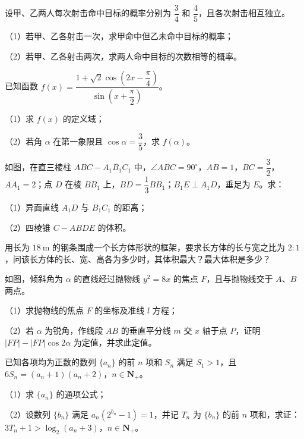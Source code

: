 \begin{question}
设甲、乙两人每次射击命中目标的概率分别为 $\dfrac34$ 和 $\dfrac45$，且各次射击相互独立。

（1）若甲、乙各射击一次，求甲命中但乙未命中目标的概率；

（2）若甲、乙各射击两次，求两人命中目标的次数相等的概率。

\end{question}
\begin{question}
已知函数 $f(x)=\dfrac{1+\sqrt2\cos\left(2x-\dfrac{\pi}{4}\right)}{\sin\left(x+\dfrac{\pi}{2}\right)}$。

（1）求 $f(x)$ 的定义域；

（2）若角 $\alpha$ 在第一象限且 $\cos\alpha=\dfrac35$，求 $f(\alpha)$。

\Needspace{0.4\textheight}
\end{question}
\begin{question}
如图，在直三棱柱 $ABC-A_1B_1C_1$ 中，$\angle ABC=90^\circ$，$AB=1$，$BC=\dfrac32$，$AA_1=2$；点 $D$ 在棱 $BB_1$ 上，$BD=\dfrac13BB_1$；$B_1E\perp A_1D$，垂足为 $E$。求：

（1）异面直线 $A_1D$ 与 $B_1C_1$ 的距离；

（2）四棱锥 $C-ABDE$ 的体积。
\nopagebreak[4]
\begin{center}\end{center}
\nopagebreak[4]
\end{question}
\begin{question}
用长为 $18\ \mathrm m$ 的钢条围成一个长方体形状的框架，要求长方体的长与宽之比为 $2:1$，问该长方体的长、宽、高各为多少时，其体积最大？最大体积是多少？

\Needspace{0.4\textheight}
\end{question}
\begin{question}
如图，倾斜角为 $\alpha$ 的直线经过抛物线 $y^2=8x$ 的焦点 $F$，且与抛物线交于 $A$、$B$ 两点。

（1）求抛物线的焦点 $F$ 的坐标及准线 $l$ 方程；

（2）若 $\alpha$ 为锐角，作线段 $AB$ 的垂直平分线 $m$ 交 $x$ 轴于点 $P$，证明 $|FP|-|FP|\cos2\alpha$ 为定值，并求此定值。
\nopagebreak[4]
\begin{center}\end{center}
\nopagebreak[4]
\end{question}
\begin{question}
已知各项均为正数的数列 $\{a_n\}$ 的前 $n$ 项和 $S_n$ 满足 $S_1>1$，且 $6S_n=(a_n+1)(a_n+2)$，$n\in\mathbf N_+$。

（1）求 $\{a_n\}$ 的通项公式；

（2）设数列 $\{b_n\}$ 满足 $a_n(2^{b_n}-1)=1$，并记 $T_n$ 为 $\{b_n\}$ 的前 $n$ 项和，求证：$3T_n+1>\log_2(a_n+3)$，$n\in\mathbf N_+$。

\end{question}